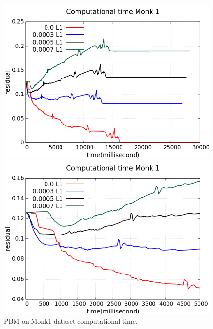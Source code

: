 \begin{figure}[H]
	\centering
	\begin{minipage}[t]{0.5\linewidth}
		\includegraphics[width=\linewidth]{data/PBM/Monk1/Monk1_PBM_L1_CT_standard.png}
	\end{minipage}%
	\begin{minipage}[t]{0.5\linewidth}
		\includegraphics[width=\linewidth]{data/PBM/Monk1/Monk1_PBM_L1_CT_zoom.png}
	\end{minipage}
	\caption{PBM on Monk1 dataset computational time.}
\end{figure}
